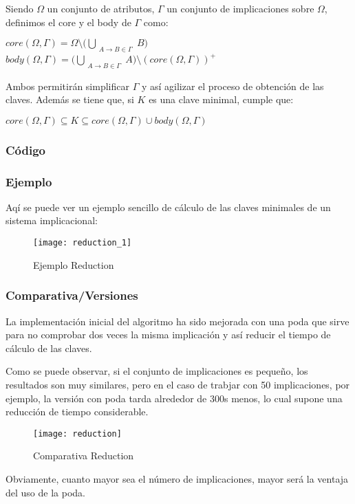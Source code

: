 Siendo \(\Omega\) un conjunto de atributos, \(\Gamma\) un conjunto de implicaciones sobre \(\Omega\), definimos el core y el body de \(\Gamma\) como:
\begin{center}
    \(core(\Omega,\Gamma) = \Omega \setminus \big(\bigcup_{\substack{A \to B \in \Gamma}} B\big) \ \ \ \ \)
    \(body(\Omega,\Gamma) = \big(\bigcup_{\substack{A \to B \in \Gamma}} A\big) \setminus (core(\Omega,\Gamma))^+\)
\end{center}
Ambos permitir\'an simplificar \(\Gamma\) y as\'i agilizar el proceso de obtenci\'on de las claves. Adem\'as se tiene que, si \(K\) es una clave minimal, cumple que: 
\begin{center}
    \(core(\Omega,\Gamma) \subseteq K \subseteq core(\Omega,\Gamma) \cup body(\Omega,\Gamma)\)
\end{center}
\newpage
\subsubsection{C\'odigo} 

\newpage
\subsubsection{Ejemplo} 
Aq\'i se puede ver un ejemplo sencillo de c\'alculo de las claves minimales de un sistema implicacional:
\begin{figure}[H]
    \centering
    \texttt{[image: reduction\_1]}
    \caption{Ejemplo Reduction}
    \label{fig:reduction_1}
\end{figure}
\subsubsection{Comparativa/Versiones} 
La implementaci\'on inicial del algoritmo ha sido mejorada con una poda que sirve para no comprobar dos veces la misma implicaci\'on y as\'i reducir el tiempo de c\'alculo de las claves.

Como se puede observar, si el conjunto de implicaciones es peque\~no, los resultados son muy similares, pero en el caso de trabjar con 50 implicaciones, por ejemplo, la versi\'on con poda tarda alrededor de 300s menos, lo cual supone una reducci\'on de tiempo considerable.

\begin{figure}[H]
    \centering
    \texttt{[image: reduction]}
    \caption{Comparativa Reduction}
    \label{fig:reduction}
\end{figure}

Obviamente, cuanto mayor sea el n\'umero de implicaciones, mayor ser\'a la ventaja del uso de la poda.